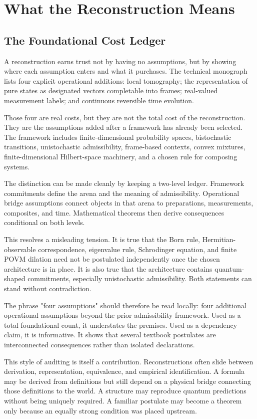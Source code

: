 \documentclass[12pt,openany]{book}
\begin{document}
\part{What the Reconstruction Means}

\chapter{The Foundational Cost Ledger}
A reconstruction earns trust not by having no assumptions, but by showing where each assumption enters and what it purchases. The technical monograph lists four explicit operational additions: local tomography; the representation of pure states as designated vectors completable into frames; real-valued measurement labels; and continuous reversible time evolution.

Those four are real costs, but they are not the total cost of the reconstruction. They are the assumptions added after a framework has already been selected. The framework includes finite-dimensional probability spaces, bistochastic transitions, unistochastic admissibility, frame-based contexts, convex mixtures, finite-dimensional Hilbert-space machinery, and a chosen rule for composing systems.

The distinction can be made cleanly by keeping a two-level ledger. Framework commitments define the arena and the meaning of admissibility. Operational bridge assumptions connect objects in that arena to preparations, measurements, composites, and time. Mathematical theorems then derive consequences conditional on both levels.

This resolves a misleading tension. It is true that the Born rule, Hermitian-observable correspondence, eigenvalue rule, Schrodinger equation, and finite POVM dilation need not be postulated independently once the chosen architecture is in place. It is also true that the architecture contains quantum-shaped commitments, especially unistochastic admissibility. Both statements can stand without contradiction.

The phrase "four assumptions" should therefore be read locally: four additional operational assumptions beyond the prior admissibility framework. Used as a total foundational count, it understates the premises. Used as a dependency claim, it is informative. It shows that several textbook postulates are interconnected consequences rather than isolated declarations.

This style of auditing is itself a contribution. Reconstructions often slide between derivation, representation, equivalence, and empirical identification. A formula may be derived from definitions but still depend on a physical bridge connecting those definitions to the world. A structure may reproduce quantum predictions without being uniquely required. A familiar postulate may become a theorem only because an equally strong condition was placed upstream.
\end{document}
